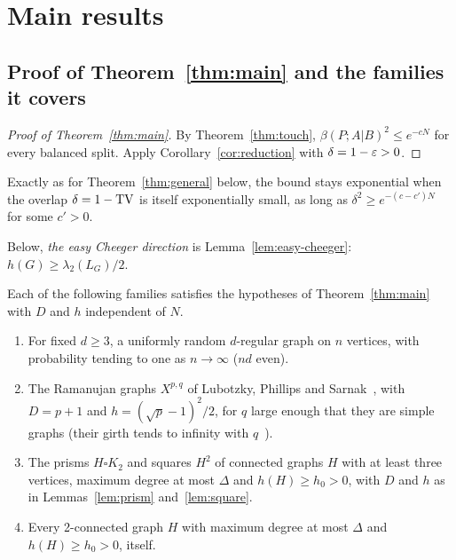 \section{Main results}\label{sec:main}

\subsection{Proof of Theorem~\ref{thm:main} and the families it covers}

\begin{proof}[Proof of Theorem~\ref{thm:main}]
By Theorem~\ref{thm:touch}, $\beta(P;A|B)^2\le e^{-cN}$ for every balanced split. Apply Corollary~\ref{cor:reduction} with $\delta=1-\varepsilon>0$.
\end{proof}

Exactly as for Theorem~\ref{thm:general} below, the bound stays exponential when the overlap $\delta=1-\mathrm{TV}$ is itself exponentially small, as long as $\delta^2\ge e^{-(c-c')N}$ for some $c'>0$.

Below, \emph{the easy Cheeger direction} is Lemma~\ref{lem:easy-cheeger}: $h(G)\ge\lambda_2(L_G)/2$.

\begin{corollary}[families]\label{cor:families}
Each of the following families satisfies the hypotheses of Theorem~\ref{thm:main} with $D$ and $h$ independent of $N$.
\begin{enumerate}[label=(\alph*)]
\item For fixed $d\ge3$, a uniformly random $d$-regular graph on $n$ vertices, with probability tending to one as $n\to\infty$ ($nd$ even).
\item The Ramanujan graphs $X^{p,q}$ of Lubotzky, Phillips and Sarnak~\cite{LPS88}, with $D=p+1$ and $h=(\sqrt p-1)^2/2$, for $q$ large enough that they are simple graphs (their girth tends to infinity with $q$~\cite{LPS88}).
\item The prisms $H\square K_2$ and squares $H^2$ of connected graphs $H$ with at least three vertices, maximum degree at most $\Delta$ and $h(H)\ge h_0>0$, with $D$ and $h$ as in Lemmas~\ref{lem:prism} and~\ref{lem:square}.
\item Every 2-connected graph $H$ with maximum degree at most $\Delta$ and $h(H)\ge h_0>0$, itself.
\end{enumerate}
\end{corollary}


